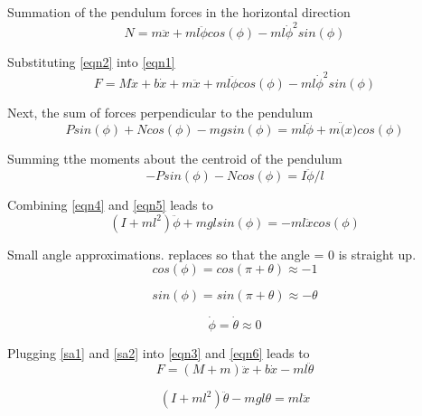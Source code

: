 \documentclass{article}
\begin{document}
Summation of the pendulum forces in the horizontal direction
\begin{equation} 
\label{eqn2}
N = m\ddot{x}+m l \ddot{\phi} cos(\phi)-m l \dot{\phi}^2sin(\phi)
\end{equation}

Substituting \ref{eqn2} into \ref{eqn1}
\begin{equation} 
\label{eqn3}
F = M\ddot{x}+b\dot{x} + m\ddot{x}+m l \ddot{\phi} cos(\phi)-m l \dot{\phi}^2sin(\phi)
\end{equation}

Next, the sum of forces perpendicular to the pendulum
\begin{equation} 
\label{eqn4}
Psin(\phi)+Ncos(\phi)-mgsin(\phi) = m l \ddot{\phi} + m\ddot(x)cos(\phi)
\end{equation}

Summing tthe moments about the centroid of the pendulum
\begin{equation} 
\label{eqn5}
-P sin(\phi)-N cos(\phi) = I \ddot{\phi}/l
\end{equation}

Combining \ref{eqn4} and \ref{eqn5} leads to 
\begin{equation} 
\label{eqn6}
(I+m l^2)\ddot{\phi} + m g lsin(\phi) = -m l \ddot{x} cos(\phi)
\end{equation}

Small angle approximations. \theta \textrm{ replaces } \phi \textrm{ so that the angle } \theta \textrm{ = 0} \degree \textrm{ is straight up}.
\\

\begin{equation} 
\label{sa1}
cos(\phi) = cos(\pi + \theta) \approx -1
\end{equation}

\begin{equation} 
\label{sa2}
sin(\phi) = sin(\pi + \theta) \approx -\theta
\end{equation}

\begin{equation} 
\label{sa3}
\dot{\phi} = \dot{\theta} \approx 0
\end{equation}

Plugging \ref{sa1} and \ref{sa2} into \ref{eqn3} and \ref{eqn6} leads to
\begin{equation} 
\label{eqn3b}
F = (M+m)\ddot{x}+b\dot{x} -m l \ddot{\theta}
\end{equation}

\begin{equation} 
\label{eqn6b}
(I+m l^2)\ddot{\theta} - m g l\theta = m l \ddot{x}
\end{equation}
\end{document}
